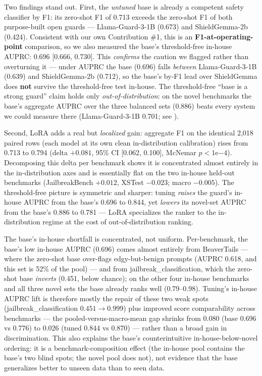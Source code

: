 \documentclass[sigconf,nonacm]{acmart}
\begin{document}
Two findings stand out. First, the \emph{untuned} base is already a competent safety classifier by F1: its zero-shot F1 of 0.713 exceeds the zero-shot F1 of both purpose-built open guards --- Llama-Guard-3-1B (0.673) and ShieldGemma-2b (0.424). Consistent with our own Contribution \#1, this is an \textbf{F1-at-operating-point} comparison, so we also measured the base's threshold-free in-house AUPRC: 0.696 [0.666, 0.730]. This \emph{confirms} the caution we flagged rather than overturning it --- under AUPRC the base (0.696) falls \emph{between} Llama-Guard-3-1B (0.639) and ShieldGemma-2b (0.712), so the base's by-F1 lead over ShieldGemma does \textbf{not} survive the threshold-free test in-house. The threshold-free ``base is a strong guard'' claim holds only \emph{out-of-distribution}: on the novel benchmarks the base's aggregate AUPRC over the three balanced sets (0.886) beats every system we could measure there (Llama-Guard-3-1B 0.701; see ).

Second, LoRA adds a real but \emph{localized} gain: aggregate F1 on the identical 2,018 paired rows (each model at its own clean in-distribution calibration) rises from 0.713 to 0.794 (delta $+0.081$, 95\% CI [0.062, 0.100], McNemar $p < 1\mathrm{e}{-4}$). Decomposing this delta per benchmark shows it is concentrated almost entirely in the in-distribution axes and is essentially flat on the two in-house held-out benchmarks (JailbreakBench $+0.012$, XSTest $-0.023$; macro $-0.005$). The threshold-free picture is symmetric and sharper: tuning \emph{raises} the guard's in-house AUPRC from the base's 0.696 to 0.844, yet \emph{lowers} its novel-set AUPRC from the base's 0.886 to 0.781 --- LoRA specializes the ranker to the in-distribution regime at the cost of out-of-distribution ranking.

The base's in-house shortfall is concentrated, not uniform. Per-benchmark, the base's low in-house AUPRC (0.696) comes almost entirely from BeaverTails --- where the zero-shot base over-flags edgy-but-benign prompts (AUPRC 0.618, and this set is 52\% of the pool) --- and from jailbreak\_classification, which the zero-shot base \emph{inverts} (0.451, below chance); on the other four in-house benchmarks and all three novel sets the base already ranks well (0.79--0.98). Tuning's in-house AUPRC lift is therefore mostly the repair of these two weak spots (jailbreak\_classification $0.451 \to 0.999$) plus improved score comparability across benchmarks --- the pooled-versus-macro-mean gap shrinks from 0.080 (base 0.696 vs 0.776) to 0.026 (tuned 0.844 vs 0.870) --- rather than a broad gain in discrimination. This also explains the base's counterintuitive in-house-below-novel ordering: it is a benchmark-composition effect (the in-house pool contains the base's two blind spots; the novel pool does not), not evidence that the base generalizes better to unseen data than to seen data.
\end{document}
